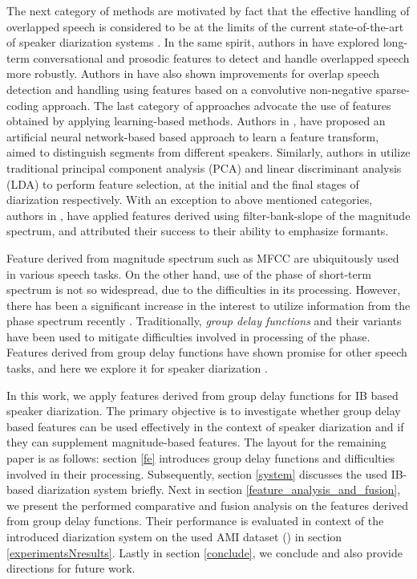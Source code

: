 \documentclass[conference]{IEEEtran}
\begin{document}
The next category of methods are motivated by fact that the effective handling of
overlapped speech is considered to be at the limits of the current 
state-of-the-art of speaker diarization systems \cite{reviewPaper1,featOverLap}. In the same
spirit, authors in \cite{featProsody,featOverLap} have explored long-term
conversational and prosodic features to detect and handle overlapped speech more
robustly. Authors in \cite{featSC} have also shown improvements for overlap speech detection and handling 
using features based on a convolutive non-negative sparse-coding approach. 
The last category of approaches advocate the use of features
obtained by applying learning-based methods. Authors in \cite{featANN}, have
proposed an artificial neural network-based based approach to learn a feature transform,
aimed to distinguish segments from different speakers. Similarly, authors in
\cite{featPCAnLDA} utilize traditional principal component analysis (PCA) and
linear discriminant analysis (LDA) to perform feature selection, at the initial
and the final stages of diarization respectively. With an exception to
above mentioned categories, authors in \cite{featFilterBank}, have applied
features derived using filter-bank-slope of the magnitude spectrum, and attributed their success to their ability to emphasize
formants. 

Feature derived from magnitude spectrum such as MFCC are ubiquitously used in various
speech tasks. On the other hand, use of the phase of short-term spectrum is not so
widespread, due to the difficulties in its processing.
However, there has been a significant increase in the interest to utilize
information from the phase spectrum recently
\cite{phaseImportantInterspeech14,gdSurvey}. Traditionally, \textit{group delay functions}
and their variants have been used to mitigate difficulties involved in
processing of the phase. Features derived from
group delay functions have shown promise for other speech tasks, and here we 
explore it for speaker diarization \cite{modifiedGD,allPoleGdSid}. 

In this work, we apply features derived from group delay functions for
IB based speaker diarization. The primary objective
is to investigate whether group delay based features can be used
effectively in the context of speaker diarization and if they can supplement magnitude-based
features. The layout for the remaining paper is as follows: section \ref{fe} introduces
group delay functions and difficulties involved in their
processing. Subsequently, section \ref{system} discusses the used IB-based diarization
system briefly. Next in section \ref{feature_analysis_and_fusion}, we present the performed comparative and fusion analysis on the features derived from group delay functions. Their performance is evaluated 
in context of the introduced diarization system on the used AMI dataset (\cite{AMIData}) in section \ref{experimentsNresults}. Lastly in section \ref{conclude}, we conclude and also provide directions for future work.    
\end{document}
